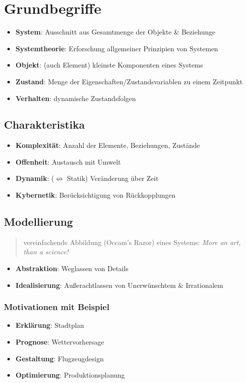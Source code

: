 \documentclass{article}
\author{Leopold Lemmermann}
\begin{document}
\createtitle

\section{Grundbegriffe}


\begin{itemize}
  \item \textbf{System}: Ausschnitt aus Gesamtmenge der Objekte \& Beziehunge
  \item \textbf{Systemtheorie}: Erforschung allgemeiner Prinzipien von Systemen
  \item \textbf{Objekt}: (auch Element) kleinste Komponenten eines Systems
  \item \textbf{Zustand}: Menge der Eigenschaften/Zustandsvariablen zu einem Zeitpunkt
  \item \textbf{Verhalten}: dynamische Zustandsfolgen
\end{itemize}

\subsection{Charakteristika}
\begin{itemize}
  \item \textbf{Komplexität}: Anzahl der Elemente, Beziehungen, Zustände
  \item \textbf{Offenheit}: Austausch mit Umwelt
  \item \textbf{Dynamik}: ($\not\leftrightarrow$ Statik) Veränderung über Zeit
  \item \textbf{Kybernetik}: Berücksichtigung von Rückkopplungen
\end{itemize}

\subsection{Modellierung}
\begin{quote}vereinfachende Abbildung (Occam's Razor) eines Systems: \textit{More an art, than a science!}\end{quote}

\begin{itemize}
  \item \textbf{Abstraktion}: Weglassen von Details
  \item \textbf{Idealisierung}: Außerachtlassen von Unerwünschtem \& Irrationalem
\end{itemize}

\subsubsection{Motivationen mit Beispiel}
\begin{itemize}
  \item \textbf{Erklärung}: Stadtplan
  \item \textbf{Prognose}: Wettervorhersage
  \item \textbf{Gestaltung}: Flugzeugdesign
  \item \textbf{Optimierung}: Produktionsplanung
\end{itemize}
\end{document}
